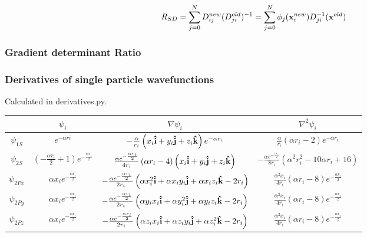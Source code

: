 \documentclass[11pt]{article}
\begin{document}
			\begin{align}
				R_{SD} &= \sum_{j = 0}^{N}D_{ij}^{new}(D_{ji}^{old})^{-1} = \sum_{j = 0}^{N} \phi_j(\vb{x}^{new}_i) D_{ji}^{-1}(\vb{x}^{old})
			\end{align}

		\subsubsection{Gradient determinant Ratio}

		\subsubsection{Derivatives of single particle wavefunctions}
			Calculated in  derivatives.py.

			\begin{center}
				\begin{tabular}{| c | c | c | c |}
				\bottomrule
				& \( \psi_i\)	& \( \nabla\psi_i \) & \( \nabla^2\psi_i \)
				\\ \hline
					\(\psi_{1S}\)
					&
					\( e^{- \alpha ri} \)
					&
					\( - \frac{\alpha}{r_{i}} \left(x_{i}\vu{i} + y_{i}\vu{j} + z_{i}\vu{k}\right) e^{- \alpha r_{i}} \)
					&
					\(\frac{\alpha}{r_{i}} \left(\alpha r_{i} - 2\right) e^{- \alpha r_{i}} \)
				\\	\hline
					\(\psi_{2S}\)
					&
					\( \left(- \frac{\alpha r_{i}}{2} + 1\right) e^{- \frac{\alpha r_{i}}{2}} \)
					&
					\( \frac{\alpha e^{- \frac{\alpha r_{i}}{2}}}{4 r_{i}} \left(\alpha r_{i} - 4\right) \left(x_{i}\vu{i} + y_{i}\vu{j} + z_{i}\vu{k}\right) \)
					&
					\( - \frac{\alpha e^{- \frac{\alpha r_{i}}{2}}}{8 r_{i}} \left(\alpha^{2} r_{i}^{2} - 10 \alpha r_{i} + 16\right) \)
				\\	\hline
					\(\psi_{2Px}\)
					&
					\( \alpha x_{i} e^{- \frac{\alpha r_{i}}{2}} \)
					&
					\( - \frac{\alpha e^{- \frac{\alpha r_{i}}{2}}}{2 r_{i}} \left(\alpha x_{i}^{2}\vu{i} + \alpha x_{i} y_{i}\vu{j} + \alpha x_{i} z_{i}\vu{k} - 2 r_{i}\right) \)
					&
					\( \frac{\alpha^{2} x_{i}}{4 r_{i}} \left(\alpha r_{i} - 8\right) e^{- \frac{\alpha r_{i}}{2}} \)
				\\	\hline
					\(\psi_{2Py}\)
					&
					\( \alpha x_{i} e^{- \frac{\alpha r_{i}}{2}} \)
					&
					\( - \frac{\alpha e^{- \frac{\alpha r_{i}}{2}}}{2 r_{i}} \left(\alpha y_{i} x_{i}\vu{i} + \alpha y_{i}^{2}\vu{j} + \alpha y_{i} z_{i}\vu{k} - 2 r_{i}\right) \)
					&
					\( \frac{\alpha^{2} x_{i}}{4 r_{i}} \left(\alpha r_{i} - 8\right) e^{- \frac{\alpha r_{i}}{2}} \)
				\\	\hline
					\(\psi_{2Pz}\)
					&
					\( \alpha x_{i} e^{- \frac{\alpha r_{i}}{2}} \)
					&
					\( - \frac{\alpha e^{- \frac{\alpha r_{i}}{2}}}{2 r_{i}} \left(\alpha z_{i} x_{i}\vu{i} + \alpha z_{i} y_{i}\vu{j} + \alpha z_{i}^{2}\vu{k} - 2 r_{i}\right) \)
					&
					\( \frac{\alpha^{2} x_{i}}{4 r_{i}} \left(\alpha r_{i} - 8\right) e^{- \frac{\alpha r_{i}}{2}} \)
				\\ \toprule
				\end{tabular}
			\end{center}
\end{document}
